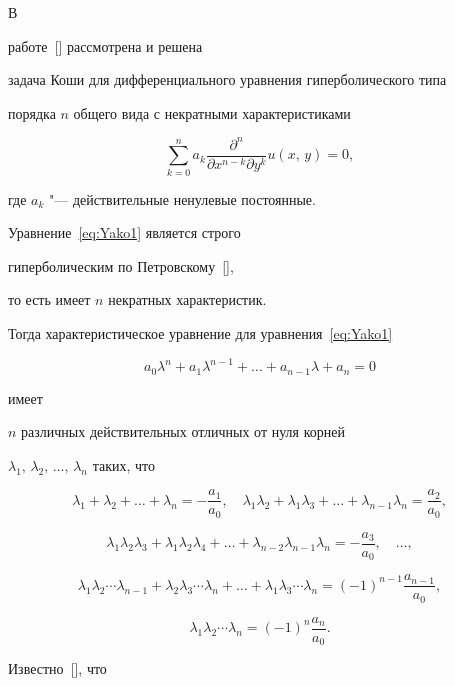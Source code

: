  В

работе~[] рассмотрена и решена

задача Коши для дифференциального уравнения гиперболического типа

 порядка $n$ общего вида с некратными характеристиками

 \begin{equation}

\sum\limits_{k=0}^{n}a_{k}\dfrac{\partial^{n}}{\partial x^{n-k}\partial y^{k}}u(x,\,y)=0,\label{eq:Yako1}

\end{equation}

где $a_{k} $ "--- действительные ненулевые постоянные.



Уравнение~\eqref{eq:Yako1} является строго

гиперболическим по Петровскому~[],

то есть имеет $n$ некратных характеристик.

Тогда характеристическое уравнение для уравнения~\eqref{eq:Yako1}

$$

a_{0}\lambda^{n}+a_{1}\lambda^{n-1}+\ldots+a_{n-1}\lambda+a_{n}=0

$$

 имеет

$n$ различных действительных отличных от нуля корней

$\lambda_{1},\,\lambda_{2},\,\dots,\,\lambda_{n}$ таких, что

$$\lambda_{1}+\lambda_{2}+\dots+\lambda_{n}=-\frac{a_{1}}{a_{0}},\quad 

\lambda_{1}\lambda_{2}+\lambda_{1}\lambda_{3}+\dots+\lambda_{n-1}\lambda_{n}=\frac{a_{2}}{a_{0}},$$

$$\lambda_{1}\lambda_{2}\lambda_{3}+\lambda_{1}\lambda_{2}\lambda_{4}+\dots+\lambda_{n-2}\lambda_{n-1}\lambda_{n}=-\frac{a_{3}}{a_{0}},\quad \dots,$$

$$\lambda_{1}\lambda_{2}\cdots\lambda_{n-1}+\lambda_{2}\lambda_{3}\cdots\lambda_{n}+\dots+\lambda_{1}\lambda_{3}\cdots\lambda_{n}=(-1)^{n-1}\frac{a_{n-1}}{a_{0}},$$

$$\lambda_{1}\lambda_{2}\cdots\lambda_{n}=(-1)^{n}\frac{a_{n}}{a_{0}}.$$



Известно~[], что

